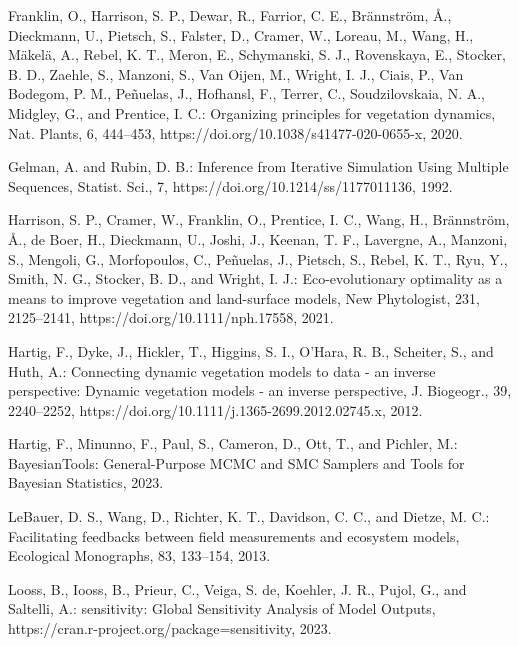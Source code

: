 \documentclass[gmd, manuscript]{copernicus}
\begin{document}
\begin{thebibliography}{}
Franklin, O., Harrison, S. P., Dewar, R., Farrior, C. E., Brännström, Å., Dieckmann, U., Pietsch, S., Falster, D., Cramer, W., Loreau, M., Wang, H., Mäkelä, A., Rebel, K. T., Meron, E., Schymanski, S. J., Rovenskaya, E., Stocker, B. D., Zaehle, S., Manzoni, S., Van Oijen, M., Wright, I. J., Ciais, P., Van Bodegom, P. M., Peñuelas, J., Hofhansl, F., Terrer, C., Soudzilovskaia, N. A., Midgley, G., and Prentice, I. C.: Organizing principles for vegetation dynamics, Nat. Plants, 6, 444–453, https://doi.org/10.1038/s41477-020-0655-x, 2020.

Gelman, A. and Rubin, D. B.: Inference from Iterative Simulation Using Multiple Sequences, Statist. Sci., 7, https://doi.org/10.1214/ss/1177011136, 1992.

Harrison, S. P., Cramer, W., Franklin, O., Prentice, I. C., Wang, H., Brännström, Å., de Boer, H., Dieckmann, U., Joshi, J., Keenan, T. F., Lavergne, A., Manzoni, S., Mengoli, G., Morfopoulos, C., Peñuelas, J., Pietsch, S., Rebel, K. T., Ryu, Y., Smith, N. G., Stocker, B. D., and Wright, I. J.: Eco-evolutionary optimality as a means to improve vegetation and land-surface models, New Phytologist, 231, 2125–2141, https://doi.org/10.1111/nph.17558, 2021.

Hartig, F., Dyke, J., Hickler, T., Higgins, S. I., O'Hara, R. B., Scheiter, S., and Huth, A.: Connecting dynamic vegetation models to data - an inverse perspective: Dynamic vegetation models - an inverse perspective, J. Biogeogr., 39, 2240–2252, https://doi.org/10.1111/j.1365-2699.2012.02745.x, 2012.

Hartig, F., Minunno, F., Paul, S., Cameron, D., Ott, T., and Pichler, M.: BayesianTools: General-Purpose MCMC and SMC Samplers and Tools for Bayesian Statistics, 2023.

LeBauer, D. S., Wang, D., Richter, K. T., Davidson, C. C., and Dietze, M. C.: Facilitating feedbacks between field measurements and ecosystem models, Ecological Monographs, 83, 133–154, 2013.

Looss, B., Iooss, B., Prieur, C., Veiga, S. de, Koehler, J. R., Pujol, G., and Saltelli, A.: sensitivity: Global Sensitivity Analysis of Model Outputs, https://cran.r-project.org/package=sensitivity, 2023.


\end{thebibliography}
\end{document}
